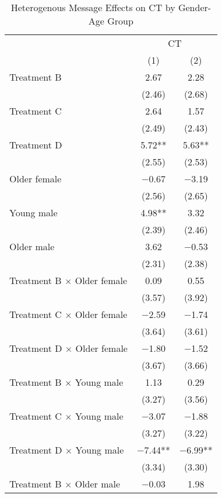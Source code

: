 \documentclass[12pt, a4paper]{article}
\begin{document}
\begin{table}[H]

\caption{\label{tab:lm-interaction-gender-age-test}Heterogenous Message Effects on CT by Gender-Age Group}
\centering
\fontsize{8}{10}\selectfont
\begin{threeparttable}
\begin{tabular}[t]{lcc}
\toprule
\multicolumn{1}{c}{ } & \multicolumn{2}{c}{CT} \\
\cmidrule(l{3pt}r{3pt}){2-3}
  & (1) & (2)\\
\midrule
Treatment B & \num{2.67} & \num{2.28}\\
 & (\num{2.46}) & (\num{2.68})\\
Treatment C & \num{2.64} & \num{1.57}\\
 & (\num{2.49}) & (\num{2.43})\\
Treatment D & \num{5.72}** & \num{5.63}**\\
 & (\num{2.55}) & (\num{2.53})\\
Older female & \num{-0.67} & \num{-3.19}\\
 & (\num{2.56}) & (\num{2.65})\\
Young male & \num{4.98}** & \num{3.32}\\
 & (\num{2.39}) & (\num{2.46})\\
Older male & \num{3.62} & \num{-0.53}\\
 & (\num{2.31}) & (\num{2.38})\\
Treatment B $\times$ Older female & \num{0.09} & \num{0.55}\\
 & (\num{3.57}) & (\num{3.92})\\
Treatment C $\times$ Older female & \num{-2.59} & \num{-1.74}\\
 & (\num{3.64}) & (\num{3.61})\\
Treatment D $\times$ Older female & \num{-1.80} & \num{-1.52}\\
 & (\num{3.67}) & (\num{3.66})\\
Treatment B $\times$ Young male & \num{1.13} & \num{0.29}\\
 & (\num{3.27}) & (\num{3.56})\\
Treatment C $\times$ Young male & \num{-3.07} & \num{-1.88}\\
 & (\num{3.27}) & (\num{3.22})\\
Treatment D $\times$ Young male & \num{-7.44}** & \num{-6.99}**\\
 & (\num{3.34}) & (\num{3.30})\\
Treatment B $\times$ Older male & \num{-0.03} & \num{1.98}\\

\end{tabular}
\end{threeparttable}
\end{table}
\end{document}
